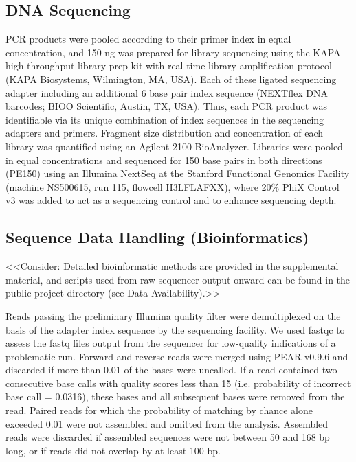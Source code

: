 \documentclass[11pt,letterpaper]{article} %
\begin{document}
\subsection{DNA Sequencing}

PCR products were pooled according to their primer index in equal concentration, and 150 ng was prepared for library sequencing using the KAPA high-throughput library prep kit with real-time library amplification protocol (KAPA Biosystems, Wilmington, MA, USA).
Each of these ligated sequencing adapter including an additional 6 base pair index sequence (NEXTflex DNA barcodes; BIOO Scientific, Austin, TX, USA).
Thus, each PCR product was identifiable via its unique combination of index sequences in the sequencing adapters and primers.
Fragment size distribution and concentration of each library was quantified using an Agilent 2100 BioAnalyzer.
Libraries were pooled in equal concentrations and sequenced for 150 base pairs in both directions (PE150) using an Illumina NextSeq at the Stanford Functional Genomics Facility (machine NS500615, run 115, flowcell H3LFLAFXX), where 20\% PhiX Control v3 was added to act as a sequencing control and to enhance sequencing depth.


\subsection*{Sequence Data Handling (Bioinformatics)}

<<Consider: Detailed bioinformatic methods are provided in the supplemental material, and scripts used from raw sequencer output onward can be found in the public project directory (see Data Availability).>>

Reads passing the preliminary Illumina quality filter were demultiplexed on the basis of the adapter index sequence by the sequencing facility.
We used fastqc to assess the fastq files output from the sequencer for low-quality indications of a problematic run.
Forward and reverse reads were merged using PEAR v0.9.6 \cite{Zhang2014} and discarded if more than 0.01 of the bases were uncalled.
If a read contained two consecutive base calls with quality scores less than 15 (i.e. probability of incorrect base call = 0.0316), these bases and all subsequent bases were removed from the read.
Paired reads for which the probability of matching by chance alone exceeded 0.01 were not assembled and omitted from the analysis.
Assembled reads were discarded if assembled sequences were not between 50 and 168 bp long, or if reads did not overlap by at least 100 bp.
\end{document}
